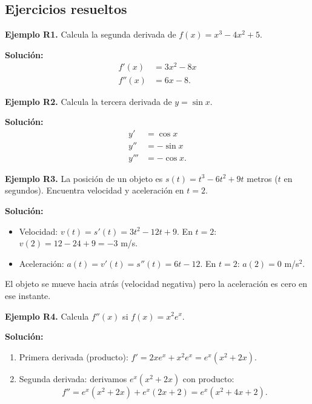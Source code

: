 \documentclass[12pt, letterpaper]{article}
\begin{document}
\subsection{Ejercicios resueltos}

\textbf{Ejemplo R1.} Calcula la segunda derivada de $f(x) = x^3 - 4x^2 + 5$.

\begin{cuadrosolucion}
  \textbf{Solución:}
  \begin{align*}
    f'(x)  & = 3x^2 - 8x \\
    f''(x) & = 6x - 8.
  \end{align*}
\end{cuadrosolucion}

\textbf{Ejemplo R2.} Calcula la tercera derivada de $y = \sin x$.

\begin{cuadrosolucion}
  \textbf{Solución:}
  \begin{align*}
    y'   & = \cos x   \\
    y''  & = -\sin x  \\
    y''' & = -\cos x.
  \end{align*}
\end{cuadrosolucion}

\textbf{Ejemplo R3.} La posición de un objeto es $s(t) = t^3 - 6t^2 + 9t$ metros ($t$ en segundos). Encuentra velocidad y aceleración en $t = 2$.

\begin{cuadrosolucion}
  \textbf{Solución:}
  \begin{itemize}
    \item Velocidad: $v(t) = s'(t) = 3t^2 - 12t + 9$. En $t = 2$: $v(2) = 12 - 24 + 9 = -3$ m/s.
    \item Aceleración: $a(t) = v'(t) = s''(t) = 6t - 12$. En $t = 2$: $a(2) = 0$ m/s$^2$.
  \end{itemize}
  El objeto se mueve hacia atrás (velocidad negativa) pero la aceleración es cero en ese instante.
\end{cuadrosolucion}

\textbf{Ejemplo R4.} Calcula $f''(x)$ si $f(x) = x^2 e^x$.

\begin{cuadrosolucion}
  \textbf{Solución:}
  \begin{enumerate}
    \item Primera derivada (producto): $f' = 2x e^x + x^2 e^x = e^x(x^2 + 2x)$.
    \item Segunda derivada: derivamos $e^x(x^2 + 2x)$ con producto:
          $$f'' = e^x(x^2 + 2x) + e^x(2x + 2) = e^x(x^2 + 4x + 2).$$
  \end{enumerate}
\end{cuadrosolucion}
\end{document}
